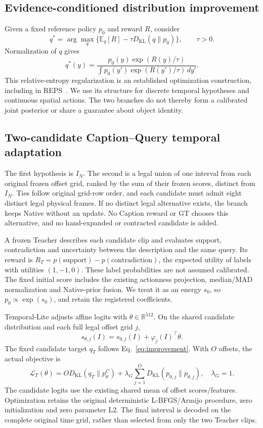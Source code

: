 \documentclass[11pt]{article}
\newcommand{\KL}{D_{\mathrm{KL}}}
\begin{document}
\subsection{Evidence-conditioned distribution improvement}
Given a fixed reference policy $p_0$ and reward $R$, consider
\begin{equation}
q^*=\arg\max_q\{\mathbb E_q[R]-\tau\KL(q\|p_0)\},\qquad \tau>0.
\end{equation}
Normalization of $q$ gives
\begin{equation}
q^*(y)=\frac{p_0(y)\exp(R(y)/\tau)}{\int p_0(y')\exp(R(y')/\tau)\,dy'}.
\label{eq:improvement}
\end{equation}
This relative-entropy regularization is an established optimization construction, including in REPS~\cite{reps}. We use its structure for discrete temporal hypotheses and continuous spatial actions. The two branches do not thereby form a calibrated joint posterior or share a guarantee about object identity.

\subsection{Two-candidate Caption--Query temporal adaptation}
The first hypothesis is $I_N$. The second is a legal union of one interval from each original frozen offset grid, ranked by the sum of their frozen scores, distinct from $I_N$. Ties follow original grid-row order, and each candidate must admit eight distinct legal physical frames. If no distinct legal alternative exists, the branch keeps Native without an update. No Caption reward or GT chooses this alternative, and no hand-expanded or contracted candidate is added.

A frozen Teacher describes each candidate clip and evaluates support, contradiction and uncertainty between the description and the same query. Its reward is $R_T=p(\mathrm{support})-p(\mathrm{contradiction})$, the expected utility of labels with utilities $(1,-1,0)$. These label probabilities are not assumed calibrated. The fixed initial score includes the existing actionness projection, median/MAD normalization and Native-prior fusion. We treat it as an energy $s_0$, so $p_0\propto\exp(s_0)$, and retain the registered coefficients.

Temporal-Lite adjusts affine logits with $\theta\in\mathbb R^{512}$. On the shared candidate distribution and each full legal offset grid $j$,
\begin{equation}
s_{\theta,j}(I)=s_{0,j}(I)+\varphi_j(I)^\top\theta.
\end{equation}
The fixed candidate target $q_T$ follows Eq.~\eqref{eq:improvement}. With $O$ offsets, the actual objective is
\begin{equation}
\mathcal L_T(\theta)=O\KL(q_T\|p^C_\theta)
 +\lambda_G\sum_{j=1}^{O}\KL(p_{0,j}\|p_{\theta,j}),\quad \lambda_G=1.
\end{equation}
The candidate logits use the existing shared mean of offset scores/features. Optimization retains the original deterministic L-BFGS/Armijo procedure, zero initialization and zero parameter L2. The final interval is decoded on the complete original time grid, rather than selected from only the two Teacher clips.
\end{document}
